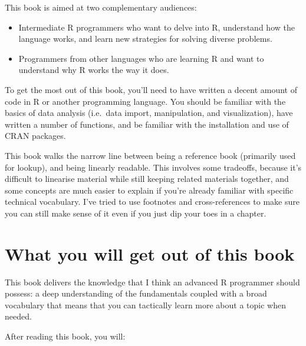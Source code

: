 \documentclass[
]{book}
\begin{document}
This book is aimed at two complementary audiences:

\begin{itemize}
\item
  Intermediate R programmers who want to delve into R, understand how
  the language works, and learn new strategies for solving diverse problems.
\item
  Programmers from other languages who are learning R and want to understand
  why R works the way it does.
\end{itemize}

To get the most out of this book, you'll need to have written a decent amount of code in R or another programming language. You should be familiar with the basics of data analysis (i.e.~data import, manipulation, and visualization), have written a number of functions, and be familiar with the installation and use of CRAN packages.

This book walks the narrow line between being a reference book (primarily used for lookup), and being linearly readable. This involves some tradeoffs, because it's difficult to linearise material while still keeping related materials together, and some concepts are much easier to explain if you're already familiar with specific technical vocabulary. I've tried to use footnotes and cross-references to make sure you can still make sense of it even if you just dip your toes in a chapter.

\hypertarget{what-you-will-get}{%
\section{What you will get out of this book}\label{what-you-will-get}}

This book delivers the knowledge that I think an advanced R programmer should possess: a deep understanding of the fundamentals coupled with a broad vocabulary that means that you can tactically learn more about a topic when needed.

After reading this book, you will:
\end{document}
